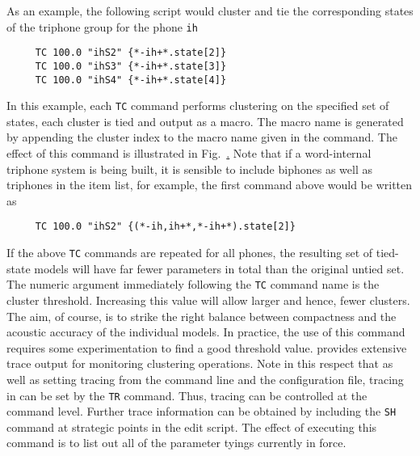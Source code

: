 As an example, the following  script would cluster and tie the
corresponding states of the triphone group for the phone \texttt{ih}
\begin{verbatim}
     TC 100.0 "ihS2" {*-ih+*.state[2]}
     TC 100.0 "ihS3" {*-ih+*.state[3]}
     TC 100.0 "ihS4" {*-ih+*.state[4]}
\end{verbatim}
In this example, each \texttt{TC} command performs clustering on the specified
set of states, each cluster is  tied and output as a macro.  The macro name
is generated by appending the cluster index to
the macro  name given in the command.   The effect of this command 
is illustrated in Fig.~\href{f:tiedstate}.  Note that if a word-internal
triphone system is being built, it is sensible to include biphones as well
as triphones in the item list, for example, the first command above would
be written as
\begin{verbatim}
     TC 100.0 "ihS2" {(*-ih,ih+*,*-ih+*).state[2]}
\end{verbatim}
If the above \texttt{TC} commands are repeated for all phones, the resulting  set of
tied-state models will have far
fewer parameters in total than the original untied set.  The numeric argument
immediately following the \texttt{TC} command name is the cluster threshold.  Increasing
this value will allow larger and hence, fewer clusters. The aim, of
course, is to strike the right balance between compactness and the acoustic
accuracy of the individual models.  In practice, the use of this command
requires some experimentation to find a good threshold value.  provides
extensive trace  output for monitoring clustering operations.  Note in this
respect that as well as setting tracing from the command line and the
configuration file, tracing in  can be set by the \texttt{TR} command. 
Thus,  tracing can be controlled at the command level. Further trace
information can be obtained by including the \texttt{SH} command at strategic
points in the edit script.  The effect of executing this command is to list
out all of the parameter tyings currently in force.


